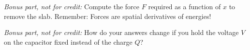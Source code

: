 \documentclass[12pt]{article}
\begin{document}
\textsl{Bonus part, not for credit:} Compute the
force $F$ required as a function of $x$ to remove the slab.
Remember: Forces are spatial derivatives of energies!

\textsl{Bonus part, not for credit:} How do your answers change if you
hold the voltage $V$ on the capacitor fixed instead of the charge $Q$?
\end{document}

